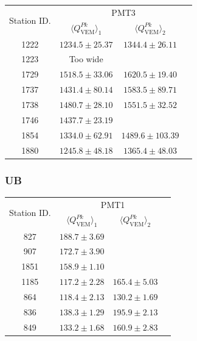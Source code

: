 \documentclass[aspectratio=169]{beamer}
\begin{document}
\begin{frame}
  \footnotesize
  \begin{tabular}{c|c|c|c} \hline
    \multirow{2}{*}{Station ID.} & \multicolumn{3}{c}{PMT3} \\
    \cline{2-4}
     & $\langle Q^{Pk}_{\mathrm{VEM}} \rangle_1$ & 
     $\langle Q^{Pk}_{\mathrm{VEM}} \rangle_2$ &  \\
     \cline{1-4}
     1222 & $1234.5\pm25.37$ & $1344.4\pm26.11$ &
     \\ \hline
     1223 & Too wide & & 
     \\ \hline
     1729 & $1518.5\pm33.06$ & $1620.5\pm19.40$ &
     \\ \hline
     1737 & $1431.4\pm80.14$ & $1583.5\pm89.71$ &
     \\ \hline
     1738 & $1480.7\pm28.10$ & $1551.5\pm32.52$ &
     \\ \hline
     1746 & $1437.7\pm23.19$ & &
     \\ \hline
     1854 & $1334.0\pm62.91$ & $1489.6\pm103.39$ &
     \\ \hline
     1880 & $1245.8\pm48.18$ & $1365.4\pm48.03$ & 
     \\ \hline
  \end{tabular}
\end{frame}

\begin{frame}
  \frametitle{UB}
  \footnotesize
  \begin{tabular}{c|c|c|c} \hline
    \multirow{2}{*}{Station ID.} & \multicolumn{3}{c}{PMT1} \\
    \cline{2-4}
    & $\langle Q^{Pk}_{\mathrm{VEM}} \rangle_1$ &
    $\langle Q^{Pk}_{\mathrm{VEM}} \rangle_2$ &  \\
    \cline{1-4}
    827 & $188.7\pm3.69$ & &
    \\ \hline
    907 & $172.7\pm3.90$ & &
    \\ \hline
    1851 & $158.9\pm1.10$ & &
    \\ \hline
    1185 & $117.2\pm2.28$ & $165.4\pm5.03$ &
    \\ \hline
    864 & $118.4\pm2.13$ & $130.2\pm1.69$ &
    \\ \hline
    836 & $138.3\pm1.29$ & $195.9\pm2.13$ &
    \\ \hline
    849 & $133.2\pm1.68$ & $160.9\pm2.83$ &
    \\ \hline
  \end{tabular}
\end{frame}
\end{document}

